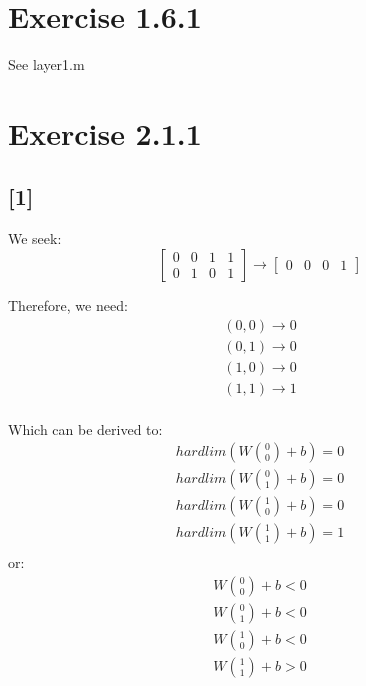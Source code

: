 \documentclass[paper=a4, fontsize=12pt]{article}%
\begin{document}
\section{Exercise 1.6.1}

See layer1.m

\section{Exercise 2.1.1}
\subsection{[1]}
We seek: \\
\begin{equation}
	\begin{bmatrix}
	    0	&0	&1	&1\\
	    0	&1	&0	&1
	\end{bmatrix}
	\rightarrow
	\begin{bmatrix}
	    0	&0	&0	&1
	\end{bmatrix}
\end{equation}

Therefore, we need: \\
\begin{equation}
	\begin{aligned}
		(0,0) \rightarrow 0 \\
		(0,1) \rightarrow 0 \\
		(1,0) \rightarrow 0 \\
		(1,1) \rightarrow 1 \\
	\end{aligned}
\end{equation}

Which can be derived to: \\
\begin{equation}
	\begin{aligned}
		hardlim(W \binom{0}{0}+ b) = 0 \\
		hardlim(W \binom{0}{1}+ b) = 0 \\
		hardlim(W \binom{1}{0}+ b) = 0 \\
		hardlim(W \binom{1}{1}+ b) = 1 \\
	\end{aligned}
\end{equation}
or: \\
\begin{equation}
	\begin{aligned}
		W \binom{0}{0}+ b < 0 \\
		W \binom{0}{1}+ b < 0 \\
		W \binom{1}{0}+ b < 0 \\
		W \binom{1}{1}+ b > 0 \\
	\end{aligned}
\end{equation}
\end{document}

